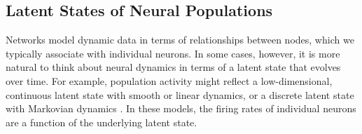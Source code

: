 


\subsection{Latent States of Neural Populations}
Networks model dynamic data in terms of relationships between nodes,
which we typically associate with individual neurons. In some cases,
however, it is more natural to think about neural dynamics in terms of 
a latent state that evolves over time. For example, population activity 
might reflect a low-dimensional, continuous latent state with smooth \citep{Yu09} 
or linear \citep{Smith-2003, paninski2010new} dynamics, or a discrete latent 
state with Markovian dynamics \citep[e.g.]{jones2007natural, latimer2015single}. 
In these models, the firing rates of individual neurons are a function
of the underlying latent state. 

